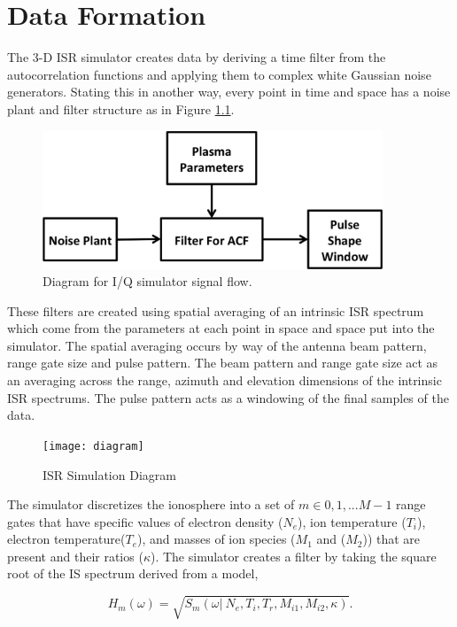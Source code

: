 \documentclass[10pt]{report}
\begin{document}
\chapter{Data Formation}
The 3-D ISR simulator creates data by deriving a time filter from the autocorrelation functions and applying them to complex white Gaussian noise generators. Stating this in another way, every point in time and space has a noise plant and filter structure as in Figure \ref{fig:IQdiagram}. 
\begin{figure}[h!]
\centering
\includegraphics[width=4in]{diagrampart}
\caption{Diagram for I/Q simulator signal flow.}
\label{fig:IQdiagram}
\end{figure}

These filters are created using spatial averaging of an intrinsic ISR spectrum which come from the parameters at each point in space and space put into the simulator. The spatial averaging occurs by way of the antenna beam pattern, range gate size and pulse pattern. The beam pattern and range gate size act as an averaging across the range, azimuth and elevation dimensions of the intrinsic ISR spectrums. The pulse pattern acts as a windowing of the final samples of the data.

\begin{figure}[!h]
\centering
\texttt{[image: diagram]}
\caption{ISR Simulation Diagram}
\label{fig:isrdiag}
\end{figure}




The simulator discretizes the ionosphere into a set of $m\in 0,1,...M-1$ range gates that have specific values of electron density ($N_e$), ion temperature ($T_i$), electron temperature($T_e$), and masses of ion species ($M_1$ and ($M_2$)) that are present and their ratios ($\kappa$).  The simulator creates a filter by taking the square root of the IS spectrum derived from a model,

\begin{equation}
\label{eq1}
H_m(\omega) = \sqrt{S_m(\omega | \: N_e, T_i,  T_r, M_{i1}, M_{i2},\kappa)}.
\end{equation}
\end{document}
